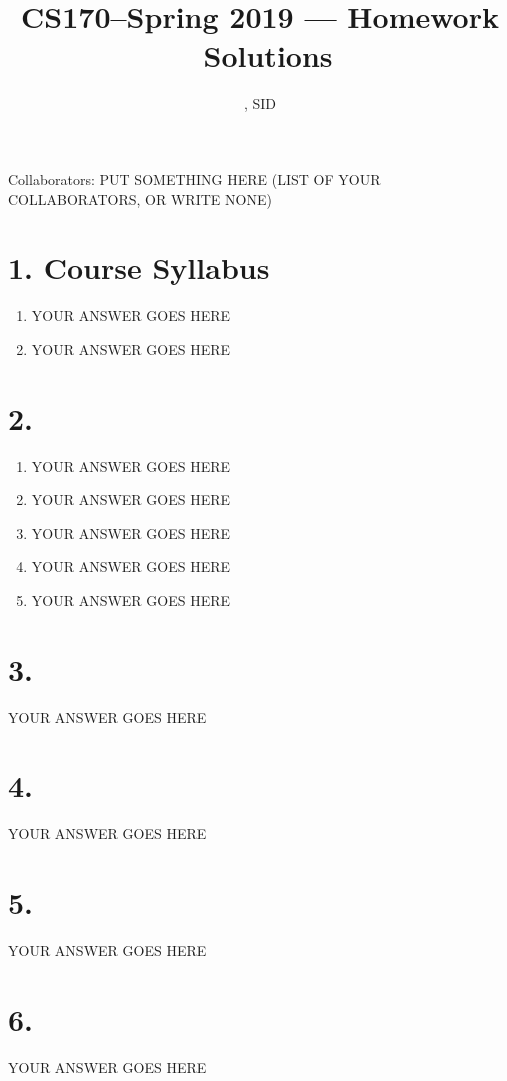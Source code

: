 \documentclass[11pt]{article}
\title{CS170--Spring 2019 --- Homework \Homework\ Solutions}
\author{\Name, SID \SID}
\date{}
\newenvironment{qparts}{\begin{enumerate}[{(}a{)}]}{\end{enumerate}}
\begin{document}
\maketitle

Collaborators: PUT SOMETHING HERE (LIST OF YOUR COLLABORATORS, OR WRITE NONE)

\section*{1. Course Syllabus}
\begin{qparts}
\item
YOUR ANSWER GOES HERE

\item
YOUR ANSWER GOES HERE

\end{qparts}



\newpage
\section*{2.}
\begin{qparts}
\item
YOUR ANSWER GOES HERE

\item
YOUR ANSWER GOES HERE

\item
YOUR ANSWER GOES HERE

\item
YOUR ANSWER GOES HERE

\item
YOUR ANSWER GOES HERE

\end{qparts}


\newpage
\section*{3.}
YOUR ANSWER GOES HERE


\newpage
\section*{4.}
YOUR ANSWER GOES HERE


\newpage
\section*{5.}
YOUR ANSWER GOES HERE


\newpage
\section*{6.}
YOUR ANSWER GOES HERE
\end{document}
